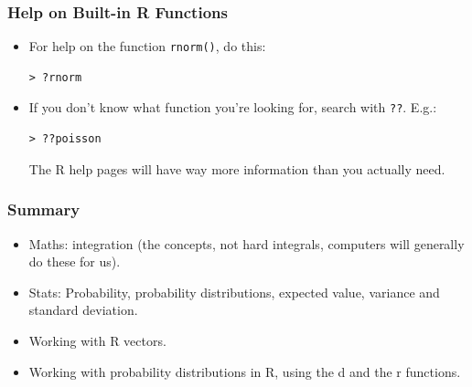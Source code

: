 \documentclass{beamer}
\begin{document}
\begin{frame}[fragile]
\frametitle{Help on Built-in R Functions}
\begin{itemize}
\item For help on the function \texttt{rnorm()}, do this:
\begin{verbatim}
> ?rnorm
\end{verbatim}
\item If you don't know what function you're looking for, search
with \texttt{??}. E.g.:
\begin{verbatim}
> ??poisson
\end{verbatim}
The R help pages will have way more information than you actually need.
\end{itemize}

\end{frame}

\begin{frame}[fragile]
\frametitle{Summary}
\begin{itemize}
\item Maths: integration (the concepts, not hard integrals, computers
will generally do these for us).\pause
\item Stats: Probability, probability distributions, expected value,
variance and standard deviation.\pause
\item Working with R vectors.\pause
\item Working with probability distributions in R, using the d and the r
functions.
\end{itemize}
\end{frame}
\end{document}
